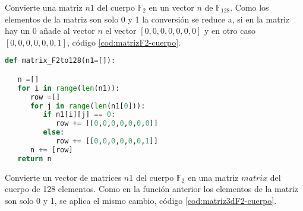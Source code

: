 Convierte una matriz $n1$ del cuerpo $\mathds{F}_2$ en un vector $n$ de $\mathds{F}_{128}$. Como los elementos de la matriz son solo 0 y 1 la conversión se reduce a, si en la matriz hay un 0 añade al vector $n$ el vector $[0,0,0,0,0,0,0]$ y en otro caso $[0,0,0,0,0,0,1]$, código \ref{cod:matrizF2-cuerpo}.

\begin{table}[H]
	\begin{center}
	\centering
	\end{center}
	\caption{Parámetros de la función \texttt{matrix\_F2to128}}
\end{table}

\vspace{0.25cm}
\begin{lstlisting}[language=Python,caption=Matriz de $\mathds{F}_2$ a un elemento del cuerpo 128 elementos, label=cod:matrizF2-cuerpo]
def matrix_F2to128(n1=[]):

   n =[]
   for i in range(len(n1)):
      row =[]
      for j in range(len(n1[0])):
         if n1[i][j] == 0:
            row += [[0,0,0,0,0,0,0]]
         else:
            row += [[0,0,0,0,0,0,1]]
      n += [row]
   return n
\end{lstlisting}


Convierte un vector de matrices $n1$ del cuerpo $\mathds{F}_2$ en una matriz $matrix$ del cuerpo de 128 elementos. Como en la función anterior los elementos de la matriz son solo 0 y 1, se aplica el mismo cambio, código \ref{cod:matriz3dF2-cuerpo}.

